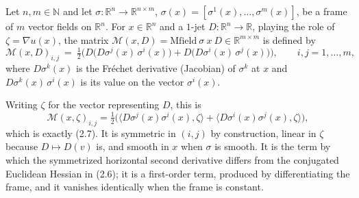 \begin{definition}
Let $n,m\in\mathbb N$ and let
$\sigma:\mathbb R^n\to\mathbb R^{n\times m}$, $\sigma(x)=[\sigma^1(x),\ldots,\sigma^m(x)]$,
be a frame of $m$ vector fields on $\mathbb R^n$. For $x\in\mathbb R^n$ and a $1$-jet
$D:\mathbb R^n\to\mathbb R$, playing the role of $\zeta=\nabla u(x)$, the matrix
$\mathcal M(x,D)=\mathrm{Mfield}\ \sigma\ x\ D\in\mathbb R^{m\times m}$ is defined by
\[
 \mathcal M(x,D)_{i,j}\ =\ \tfrac12\Big(
   D\big(D\sigma^{j}(x)\,\sigma^{i}(x)\big)+D\big(D\sigma^{i}(x)\,\sigma^{j}(x)\big)\Big),
 \qquad i,j=1,\ldots,m,
\]
where $D\sigma^{k}(x)$ is the Fr\'echet derivative (Jacobian) of $\sigma^{k}$ at $x$ and
$D\sigma^{k}(x)\,\sigma^{i}(x)$ is its value on the vector $\sigma^{i}(x)$.

Writing $\zeta$ for the vector representing $D$, this is
\[
 \mathcal M(x,\zeta)_{i,j}=\tfrac12\big(\langle D\sigma^{j}(x)\sigma^{i}(x),\zeta\rangle
  +\langle D\sigma^{i}(x)\sigma^{j}(x),\zeta\rangle\big),
\]
which is exactly (2.7). It is symmetric in $(i,j)$ by construction, linear in $\zeta$
because $D\mapsto D(v)$ is, and smooth in $x$ when $\sigma$ is smooth. It is the term by
which the symmetrized horizontal second derivative differs from the conjugated Euclidean
Hessian in (2.6); it is a first-order term, produced by differentiating the frame, and
it vanishes identically when the frame is constant.
\end{definition}
